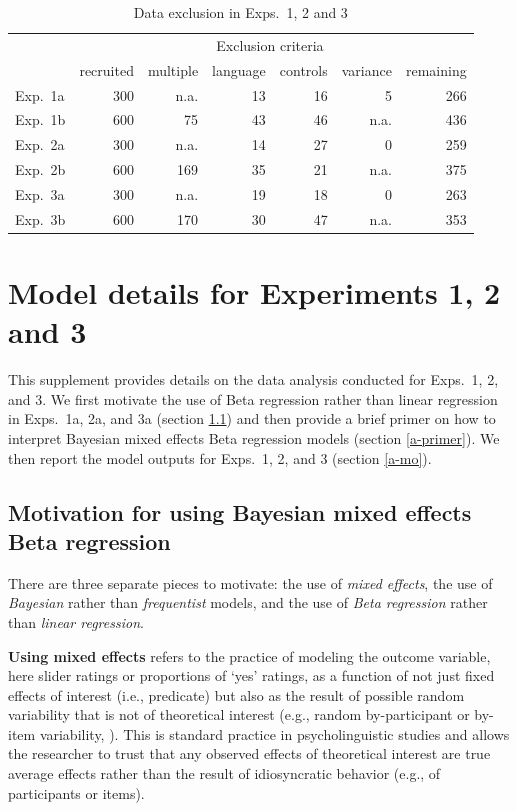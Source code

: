 \documentclass[11pt,fleqn]{article}
\newcommand{\6}{\mbox{$[\hspace*{-.6mm}[$}}
\newcommand{\9}{\mbox{$]\hspace*{-.6mm}]$}}
\begin{document}
\begin{table}[h!]
\centering
\begin{tabular}{l r | r r r r | r}
&  & \multicolumn{4}{c|}{Exclusion criteria} &  \\ 
&  recruited & multiple & language & controls & variance & remaining \\ 
\hline
Exp.~1a & 300 & n.a. & 13 & 16 & 5 & 266 \\
Exp.~1b & 600 & 75 & 43 & 46 & n.a. & 436 \\
Exp.~2a & 300 & n.a. & 14 & 27 & 0 & 259 \\
Exp.~2b & 600 & 169 & 35 & 21  & n.a. & 375 \\
Exp.~3a & 300 & n.a. & 19 & 18 & 0 & 263 \\
Exp.~3b & 600 & 170 & 30 & 47 & n.a. & 353 \\
\end{tabular}
\caption{Data exclusion in Exps.~1, 2 and 3}\label{f-exclusion}
\end{table} 

\section{Model details for Experiments 1, 2 and 3}\label{modeldetails}

This supplement provides details on the data analysis conducted for Exps.~1, 2, and 3. We first motivate the use of Beta regression rather than linear regression in Exps.~1a, 2a, and 3a (section \ref{a-motivation}) and then provide a brief primer on how to interpret Bayesian mixed effects Beta regression models (section \ref{a-primer}). We then report the model outputs for Exps.~1, 2, and 3 (section \ref{a-mo}).

\subsection{Motivation for using Bayesian mixed effects Beta regression}\label{a-motivation}

There are three separate pieces to motivate: the use of \emph{mixed effects}, the use of \emph{Bayesian} rather than \emph{frequentist} models, and the use of \emph{Beta regression} rather than \emph{linear regression}. 

\textbf{Using mixed effects} refers to the practice of modeling the outcome variable, here slider ratings or proportions of `yes' ratings, as a function of not just fixed effects of interest (i.e., predicate) but also as the result of possible random variability that is not of theoretical interest (e.g., random by-participant or by-item variability, \citealt{gelman2006}). This is standard practice in psycholinguistic studies and allows the researcher to trust that any observed effects of theoretical interest are true average effects rather than the result of idiosyncratic behavior (e.g., of participants or items). 
\end{document}
